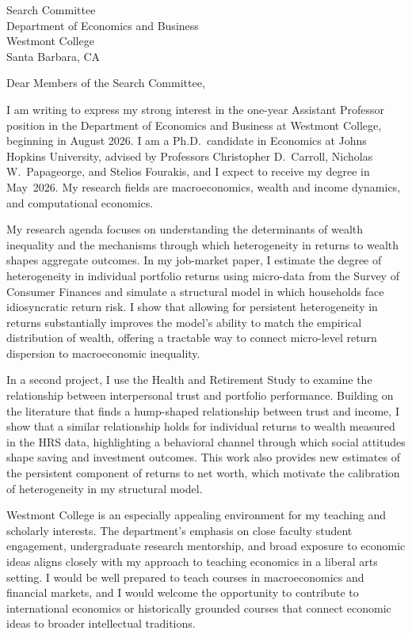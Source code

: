 \documentclass[11pt,letterpaper]{letter}
\begin{document}
\begin{letter}{
Search Committee \\
Department of Economics and Business \\
Westmont College \\
Santa Barbara, CA
}

\opening{Dear Members of the Search Committee,}

I am writing to express my strong interest in the one-year Assistant Professor position in the Department of Economics and Business at Westmont College, beginning in August 2026. I am a Ph.D.\ candidate in Economics at Johns Hopkins University, advised by Professors Christopher D.~Carroll, Nicholas W.~Papageorge, and Stelios Fourakis, and I expect to receive my degree in May~2026. My research fields are macroeconomics, wealth and income dynamics, and computational economics.

My research agenda focuses on understanding the determinants of wealth inequality and the mechanisms through which heterogeneity in returns to wealth shapes aggregate outcomes. In my job-market paper, I estimate the degree of heterogeneity in individual portfolio returns using micro-data from the Survey of Consumer Finances and simulate a structural model in which households face idiosyncratic return risk. I show that allowing for persistent heterogeneity in returns substantially improves the model’s ability to match the empirical distribution of wealth, offering a tractable way to connect micro-level return dispersion to macroeconomic inequality.

In a second project, I use the Health and Retirement Study to examine the relationship between interpersonal trust and portfolio performance. Building on the literature that finds a hump-shaped relationship between trust and income, I show that a similar relationship holds for individual returns to wealth measured in the HRS data, highlighting a behavioral channel through which social attitudes shape saving and investment outcomes. This work also provides new estimates of the persistent component of returns to net worth, which motivate the calibration of heterogeneity in my structural model.

Westmont College is an especially appealing environment for my teaching and scholarly interests. The department’s emphasis on close faculty student engagement, undergraduate research mentorship, and broad exposure to economic ideas aligns closely with my approach to teaching economics in a liberal arts setting. I would be well prepared to teach courses in macroeconomics and financial markets, and I would welcome the opportunity to contribute to international economics or historically grounded courses that connect economic ideas to broader intellectual traditions.


\end{letter}
\end{document}
